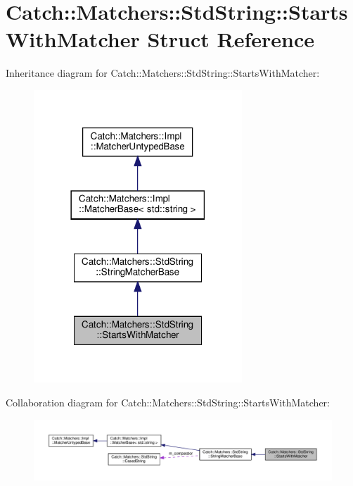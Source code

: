 \hypertarget{structCatch_1_1Matchers_1_1StdString_1_1StartsWithMatcher}{}\section{Catch\+:\+:Matchers\+:\+:Std\+String\+:\+:Starts\+With\+Matcher Struct Reference}
\label{structCatch_1_1Matchers_1_1StdString_1_1StartsWithMatcher}


Inheritance diagram for Catch\+:\+:Matchers\+:\+:Std\+String\+:\+:Starts\+With\+Matcher\+:\nopagebreak
\begin{figure}[H]
\begin{center}
\leavevmode
\includegraphics[width=222pt]{structCatch_1_1Matchers_1_1StdString_1_1StartsWithMatcher__inherit__graph}
\end{center}
\end{figure}


Collaboration diagram for Catch\+:\+:Matchers\+:\+:Std\+String\+:\+:Starts\+With\+Matcher\+:\nopagebreak
\begin{figure}[H]
\begin{center}
\leavevmode
\includegraphics[width=350pt]{structCatch_1_1Matchers_1_1StdString_1_1StartsWithMatcher__coll__graph}
\end{center}
\end{figure}
